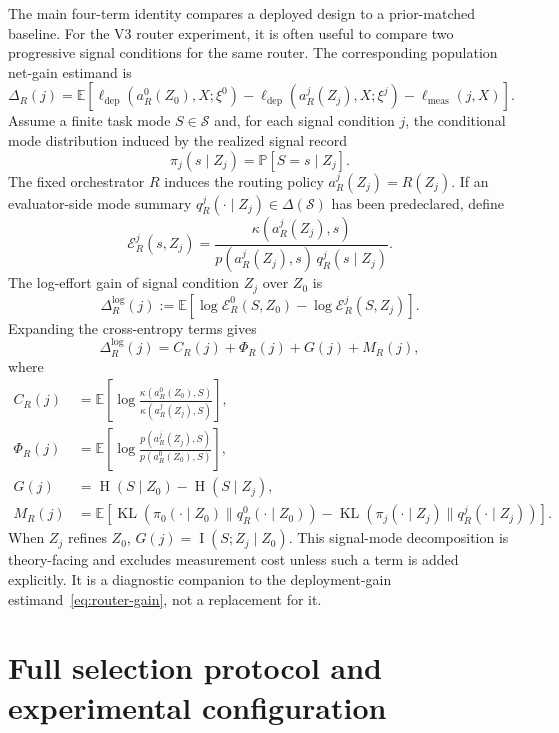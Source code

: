 \documentclass{article}
\DeclareMathOperator{\KL}{KL}
\DeclareMathOperator{\MI}{I}
\DeclareMathOperator{\Hent}{H}
\newcommand{\cS}{\mathcal{S}}
\newcommand{\E}{\mathbb{E}}
\newcommand{\Prb}{\mathbb{P}}
\begin{document}
The main four-term identity compares a deployed design to a prior-matched baseline.
For the V3 router experiment, it is often useful to compare two progressive signal conditions for the same router.
The corresponding population net-gain estimand is
\begin{equation}
\Delta_R(j)
=
\E\!\left[
  \ell_{\mathrm{dep}}(a_R^0(Z_0),X;\xi^0)
  -
  \ell_{\mathrm{dep}}(a_R^j(Z_j),X;\xi^j)
  -
  \ell_{\mathrm{meas}}(j,X)
\right].
\label{eq:router-gain}
\end{equation}
Assume a finite task mode $S\in\cS$ and, for each signal condition $j$, the conditional mode distribution induced by the realized signal record
\[
\pi_j(s\mid Z_j)=\Prb[S=s\mid Z_j].
\]
The fixed orchestrator $R$ induces the routing policy $a_R^j(Z_j)=R(Z_j)$.
If an evaluator-side mode summary $q_R^j(\cdot\mid Z_j)\in\Delta(\cS)$ has been predeclared, define
\[
\mathcal E_R^j(s,Z_j)
=
\frac{\kappa(a_R^j(Z_j),s)}
{p(a_R^j(Z_j),s)\,q_R^j(s\mid Z_j)} .
\]
The log-effort gain of signal condition $Z_j$ over $Z_0$ is
\[
\Delta_R^{\log}(j)
:=
\E[
\log \mathcal E_R^0(S,Z_0)-\log \mathcal E_R^j(S,Z_j)
].
\]
Expanding the cross-entropy terms gives
\[
\Delta_R^{\log}(j)
=
C_R(j)+\Phi_R(j)+G(j)+M_R(j),
\]
where
\begin{align*}
C_R(j)
&=
\E\!\left[
\log\frac{\kappa(a_R^0(Z_0),S)}{\kappa(a_R^j(Z_j),S)}
\right],
\\
\Phi_R(j)
&=
\E\!\left[
\log\frac{p(a_R^j(Z_j),S)}{p(a_R^0(Z_0),S)}
\right],
\\
G(j)
&=
\Hent(S\mid Z_0)-\Hent(S\mid Z_j),
\\
M_R(j)
&=
\E\!\left[
\KL(\pi_0(\cdot\mid Z_0)\|q_R^0(\cdot\mid Z_0))
-
\KL(\pi_j(\cdot\mid Z_j)\|q_R^j(\cdot\mid Z_j))
\right].
\end{align*}
When $Z_j$ refines $Z_0$, $G(j)=\MI(S;Z_j\mid Z_0)$.
This signal-mode decomposition is theory-facing and excludes measurement cost unless such a term is added explicitly.
It is a diagnostic companion to the deployment-gain estimand~\eqref{eq:router-gain}, not a replacement for it.

\section{Full selection protocol and experimental configuration}
\label{app:experiment-details}
\end{document}
